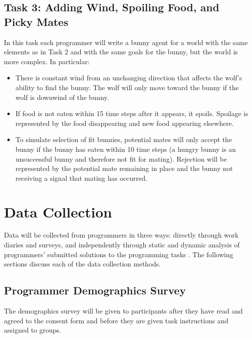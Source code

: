 \begin{appendices}
\subsection{Task 3: Adding Wind, Spoiling Food, and Picky Mates}\label{sec:task3}

In this task each programmer will write a bunny agent for a world with the same elements as in Task 2 and with the same goals for the bunny, but the world is more complex.  In particular:

\begin{itemize}

\item There is constant wind from an unchanging direction that affects the wolf's ability to find the bunny.  The wolf will only move toward the bunny if the wolf is downwind of the bunny.

\item If food is not eaten within 15 time steps after it appears, it spoils.  Spoilage is represented by the food disappearing and new food appearing elsewhere.

\item To simulate selection of fit bunnies, potential mates will only accept the bunny if the bunny has eaten within 10 time steps (a hungry bunny is an unsuccessful bunny and therefore not fit for mating).  Rejection will be represented by the potential mate remaining in place and the bunny not receiving a signal that mating has occurred.

\end{itemize}



\section{Data Collection}

Data will be collected from programmers in three ways: directly through work diaries and surveys, and independently through static and dynamic analysis of programmers' submitted solutions to the programming tasks \cite{singer2008a-software}.  The following sections discuss each of the data collection methods.

\subsection{Programmer Demographics Survey}

The demographics survey will be given to participants after they have read and agreed to the consent form and before they are given task instructions and assigned to groups.


\end{appendices}
